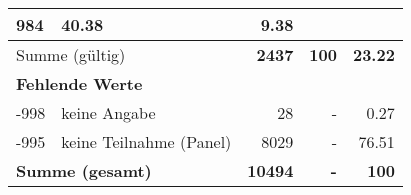 \begin{longtable}{lXrrr}
       \num{984} &
       \num[round-mode=places,round-precision=2]{40,38} &
         \num[round-mode=places,round-precision=2]{9,38} \\
     \midrule
     \multicolumn{2}{l}{Summe (gültig)} &
       \textbf{\num{2437}} &
     \textbf{100} &
       \textbf{\num[round-mode=places,round-precision=2]{23,22}} \\
     \multicolumn{5}{l}{\textbf{Fehlende Werte}}\\
       -998 &
       keine Angabe &
         \num{28} &
        - &
         \num[round-mode=places,round-precision=2]{0,27} \\
       -995 &
       keine Teilnahme (Panel) &
         \num{8029} &
        - &
         \num[round-mode=places,round-precision=2]{76,51} \\
     \midrule
     \multicolumn{2}{l}{\textbf{Summe (gesamt)}} &
          \textbf{\num{10494}} &
        \textbf{-} &
        \textbf{100} \\
     \bottomrule
     \end{longtable}
     
